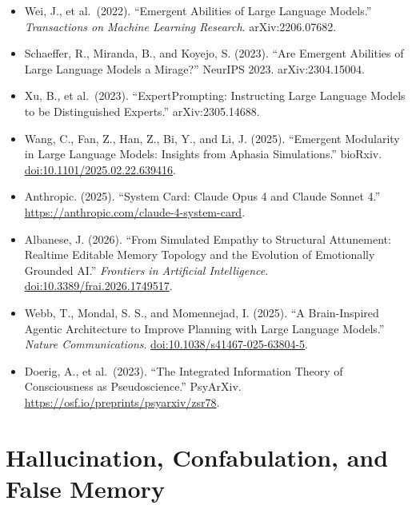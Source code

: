 \documentclass[12pt]{article}
\providecommand{\tightlist}{\setlength{\itemsep}{0pt}\setlength{\parskip}{0pt}}
\begin{document}
\begin{itemize}
\tightlist
\item
  Wei, J., et al.~(2022). ``Emergent Abilities of Large Language
  Models.'' \emph{Transactions on Machine Learning Research}.
  arXiv:2206.07682.
\item
  Schaeffer, R., Miranda, B., and Koyejo, S. (2023). ``Are Emergent
  Abilities of Large Language Models a Mirage?'' NeurIPS 2023.
  arXiv:2304.15004.
\item
  Xu, B., et al.~(2023). ``ExpertPrompting: Instructing Large Language
  Models to be Distinguished Experts.'' arXiv:2305.14688.
\item
  Wang, C., Fan, Z., Han, Z., Bi, Y., and Li, J. (2025). ``Emergent
  Modularity in Large Language Models: Insights from Aphasia
  Simulations.'' bioRxiv. \url{doi:10.1101/2025.02.22.639416}.
\item
  Anthropic. (2025). ``System Card: Claude Opus 4 and Claude Sonnet 4.''
  \url{https://anthropic.com/claude-4-system-card}.
\item
  Albanese, J. (2026). ``From Simulated Empathy to Structural
  Attunement: Realtime Editable Memory Topology and the Evolution of
  Emotionally Grounded AI.'' \emph{Frontiers in Artificial
  Intelligence}. \url{doi:10.3389/frai.2026.1749517}.
\item
  Webb, T., Mondal, S. S., and Momennejad, I. (2025). ``A Brain-Inspired
  Agentic Architecture to Improve Planning with Large Language Models.''
  \emph{Nature Communications}. \url{doi:10.1038/s41467-025-63804-5}.
\item
  Doerig, A., et al.~(2023). ``The Integrated Information Theory of
  Consciousness as Pseudoscience.'' PsyArXiv.
  \url{https://osf.io/preprints/psyarxiv/zsr78}.
\end{itemize}

\section{Hallucination, Confabulation, and False
Memory}\label{hallucination-confabulation-and-false-memory}
\end{document}
